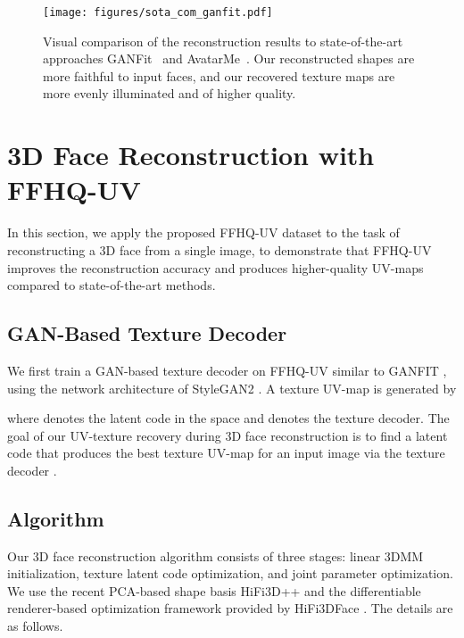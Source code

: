 \documentclass[10pt,twocolumn,letterpaper]{article}
\begin{document}
\begin{figure*}[!t]
  \centering
   \texttt{[image: figures/sota\_com\_ganfit.pdf]}
   \caption{Visual comparison of the reconstruction results to state-of-the-art approaches GANFit~\cite{gecer2019ganfit} and AvatarMe~\cite{lattas2020avatarme}. Our reconstructed shapes are more faithful to input faces, and our recovered texture maps are more evenly illuminated and of higher quality.}
   \label{fig:sota-com-ganfit}
\end{figure*}




\vspace{2mm}
\section{3D Face Reconstruction with FFHQ-UV}
\vspace{-2mm}


In this section, we apply the proposed FFHQ-UV dataset to the task of reconstructing a 3D face from a single image, to demonstrate that FFHQ-UV improves the reconstruction accuracy and produces higher-quality UV-maps compared to state-of-the-art methods. 


\vspace{-4mm}
\subsection{GAN-Based Texture Decoder}
\label{sec:tex-gan}
\vspace{-2mm}


We first train a GAN-based texture decoder on FFHQ-UV similar to GANFIT \cite{gecer2019ganfit}, using the network architecture of StyleGAN2 \cite{karras2020analyzing}. A texture UV-map  is generated by

where  denotes the latent code in the  space and  denotes the texture decoder.
The goal of our UV-texture recovery during 3D face reconstruction is to find a latent code  that produces the best texture UV-map for an input image via the texture decoder . 


\subsection{Algorithm}
\label{sec:param-fit}

Our 3D face reconstruction algorithm consists of three stages: linear 3DMM initialization, texture latent code  optimization, and joint parameter optimization. We use the recent PCA-based shape basis HiFi3D++ \cite{chai2022realy} and the differentiable renderer-based optimization framework provided by HiFi3DFace \cite{bao2021high}. The details are as follows. 
\end{document}
